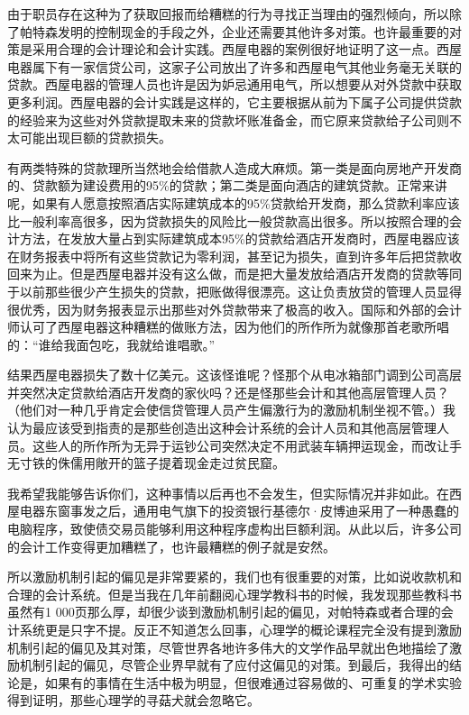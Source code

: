 由于职员存在这种为了获取回报而给糟糕的行为寻找正当理由的强烈倾向，所以除了帕特森发明的控制现金的手段之外，企业还需要其他许多对策。也许最重要的对策是采用合理的会计理论和会计实践。西屋电器的案例很好地证明了这一点。西屋电器属下有一家信贷公司，这家子公司放出了许多和西屋电气其他业务毫无关联的贷款。西屋电器的管理人员也许是因为妒忌通用电气，所以想要从对外贷款中获取更多利润。西屋电器的会计实践是这样的，它主要根据从前为下属子公司提供贷款的经验来为这些对外贷款提取未来的贷款坏账准备金，而它原来贷款给子公司则不太可能出现巨额的贷款损失。
\par

有两类特殊的贷款理所当然地会给借款人造成大麻烦。第一类是面向房地产开发商的、贷款额为建设费用的95\%的贷款；第二类是面向酒店的建筑贷款。正常来讲呢，如果有人愿意按照酒店实际建筑成本的95\%贷款给开发商，那么贷款利率应该比一般利率高很多，因为贷款损失的风险比一般贷款高出很多。所以按照合理的会计方法，在发放大量占到实际建筑成本95\%的贷款给酒店开发商时，西屋电器应该在财务报表中将所有这些贷款记为零利润，甚至记为损失，直到许多年后把贷款收回来为止。但是西屋电器并没有这么做，而是把大量发放给酒店开发商的贷款等同于以前那些很少产生损失的贷款，把账做得很漂亮。这让负责放贷的管理人员显得很优秀，因为财务报表显示出那些对外贷款带来了极高的收入。国际和外部的会计师认可了西屋电器这种糟糕的做账方法，因为他们的所作所为就像那首老歌所唱的：“谁给我面包吃，我就给谁唱歌。”
\par

结果西屋电器损失了数十亿美元。这该怪谁呢？怪那个从电冰箱部门调到公司高层并突然决定贷款给酒店开发商的家伙吗？还是怪那些会计和其他高层管理人员？（他们对一种几乎肯定会使信贷管理人员产生偏激行为的激励机制坐视不管。）我认为最应该受到指责的是那些创造出这种会计系统的会计人员和其他高层管理人员。这些人的所作所为无异于运钞公司突然决定不用武装车辆押运现金，而改让手无寸铁的侏儒用敞开的篮子提着现金走过贫民窟。
\par

我希望我能够告诉你们，这种事情以后再也不会发生，但实际情况并非如此。在西屋电器东窗事发之后，通用电气旗下的投资银行基德尔·皮博迪采用了一种愚蠢的电脑程序，致使债交易员能够利用这种程序虚构出巨额利润。从此以后，许多公司的会计工作变得更加糟糕了，也许最糟糕的例子就是安然。
\par

所以激励机制引起的偏见是非常要紧的，我们也有很重要的对策，比如说收款机和合理的会计系统。但是当我在几年前翻阅心理学教科书的时候，我发现那些教科书虽然有1 000页那么厚，却很少谈到激励机制引起的偏见，对帕特森或者合理的会计系统更是只字不提。反正不知道怎么回事，心理学的概论课程完全没有提到激励机制引起的偏见及其对策，尽管世界各地许多伟大的文学作品早就出色地描绘了激励机制引起的偏见，尽管企业界早就有了应付这偏见的对策。到最后，我得出的结论是，如果有的事情在生活中极为明显，但很难通过容易做的、可重复的学术实验得到证明，那些心理学的寻菇犬就会忽略它。
\par

